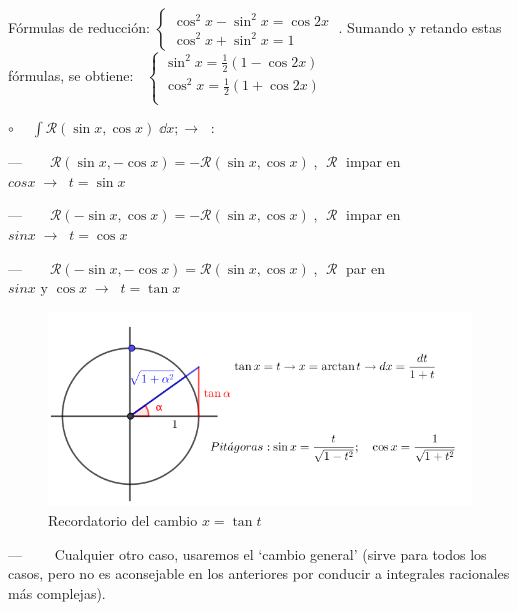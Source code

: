 {Fórmulas de reducción: $\begin{cases}
\cos^2x	- \sin^2 x = \cos 2x \\
\cos^2 x + \sin^2 x = 1
\end{cases}\; $. Sumando y retando estas fórmulas, se obtiene:
$\boxed{\; \; \begin{cases}
\sin^2 x = \frac 1 2 (1-\cos 2x) \\
\cos^2 x = \frac 1 2 (1+\cos 2x) \\	
\end{cases}\; }$

\vspace{3mm}

$\circ \quad  \displaystyle \; \int \mathcal {R} (\sin x, \cos x)\; \dd x ; \to \; $ :

\hspace{5mm} $ \text{---} \qquad \mathcal {R} (\sin x, -\cos x)=-\mathcal {R} (\sin x, \cos x)\; $, $\; \mathcal{R}\; $ impar en $cos x\; \to \;  \boxed{\; t=\sin x \;} $
 
 \hspace{5mm} $ \text{---} \qquad \mathcal {R} (-\sin x, \cos x)=-\mathcal {R} (\sin x, \cos x)\; $, $\; \mathcal{R}\; $ impar en $sin x\; \to \;  \boxed{\; t=\cos x \;} $
 
 \hspace{5mm} $ \text{---} \qquad \mathcal {R} (-\sin x, -\cos x)=\mathcal {R} (\sin x, \cos x)\; $, $\; \mathcal{R}\; $ par en $sin x \text { y } \cos x\; \to \;  \boxed{\; t=\tan x \;} $
 
	\begin{figure}[H]
		\centering
		\includegraphics[width=1\textwidth]{imagenes/imagenes07/T07IM03.png}
		\caption{Recordatorio del cambio $x=\tan t$}
	\end{figure}
 
 
 \hspace{5mm} $ \text{---} \qquad$ Cualquier otro caso, usaremos el `cambio general' (sirve para todos los casos, pero no es aconsejable en los anteriores por conducir a integrales racionales más complejas).
 
}
